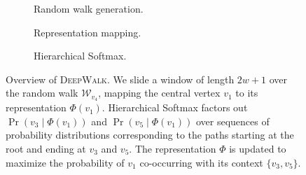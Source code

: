 \documentclass{sig-alternate}
\newcommand{\ouralgorithm}{\textsc{DeepWalk}}
\begin{document}
\begin{figure}

\begin{subfigure}[b]{0.30\textwidth}
\caption{Random walk generation.}
\label{fig:graph}
\end{subfigure}
\begin{subfigure}[b]{0.30\textwidth}
\caption{Representation mapping.}
\label{fig:phi}
\end{subfigure}
\begin{subfigure}[b]{0.4\textwidth}
\caption{Hierarchical Softmax.}
\label{fig:hsm}
\end{subfigure}

\caption{Overview of \ouralgorithm.
We slide a window of length $2w+1$ over the random walk $\mathcal{W}_{v_4}$, mapping the central vertex $v_1$ to its representation $\Phi(v_1)$.
Hierarchical Softmax factors  out $\Pr(v_3 \mid \Phi(v_1))$ and $\Pr(v_5 \mid \Phi(v_1))$ over sequences of probability distributions corresponding to the paths starting at the root and ending at $v_3$ and $v_5$.
The representation $\Phi$ is updated to maximize the probability of $v_1$ co-occurring with its context $\{v_3, v_5\}$.
}
\end{figure}
\end{document}

